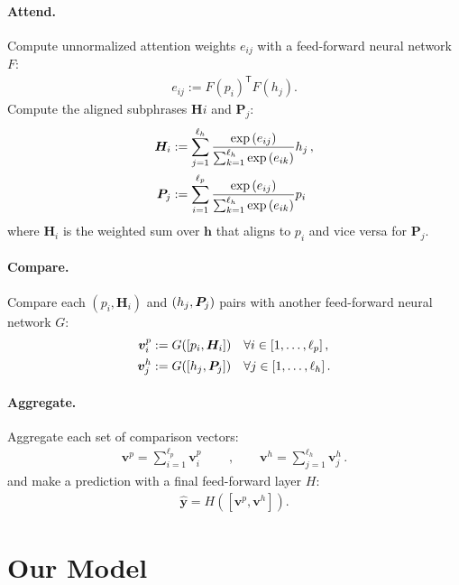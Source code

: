 \documentclass[11pt,a4paper]{article}
\begin{document}
\paragraph{Attend.} Compute unnormalized attention weights $e_{ij}$ with
a feed-forward neural network $F$:
\begin{align}\label{eq:attend}
    e_{ij} := F(p_i)^\mathsf{T} F(h_j).
\end{align}
Compute the aligned subphrases $\bm{H}i$ and $\bm{P}_j$:
\begin{align}
    \bm{H}_i &:= \sum_{j=1}^{\ell_h}\frac{\exp{(e_{ij})}}
                                        {\sum_{k=1}^{\ell_h}\exp{(e_{ik})}}h_j\,, \notag \\
    \bm{P}_j &:= \sum_{i=1}^{\ell_p}\frac{\exp{(e_{ij})}}
                                        {\sum_{k=1}^{\ell_h}\exp{(e_{ik})}}p_i\
\end{align}
where $\bm{H}_i$ is the weighted sum over $\bm{h}$ that aligns to $p_i$ and vice versa
for $\bm{P}_j$.

\paragraph{Compare.} Compare each $(p_i, \bm{H}_i)$ and $(h_j, \bm{P_}j)$ pairs
with another feed-forward neural network $G$:
\begin{align}
    \bm{v}^p_i &:= G([p_i, \bm{H}_i])\quad \forall i \in [1,\ldots, \ell_p]\,, \notag \\
    \bm{v}^h_j &:= G([h_j, \bm{P}_j])\quad \forall j \in [1,\ldots, \ell_h]\,.
\end{align}

\paragraph{Aggregate.} Aggregate each set of comparison vectors:
\begin{align}
\bm{v}^p = \sum_{i=1}^{\ell_p} \bm{v}^p_i \qquad\,, \qquad
\bm{v}^h = \sum_{j=1}^{\ell_h}  \bm{v}^h_j\,.
\end{align}
and make a prediction with a final feed-forward layer $H$:
\begin{align}\label{eq:predict}
    \hat{\bm{y}} = H([\bm{v}^p, \bm{v}^h]).
\end{align}

\section{Our Model}
\end{document}
